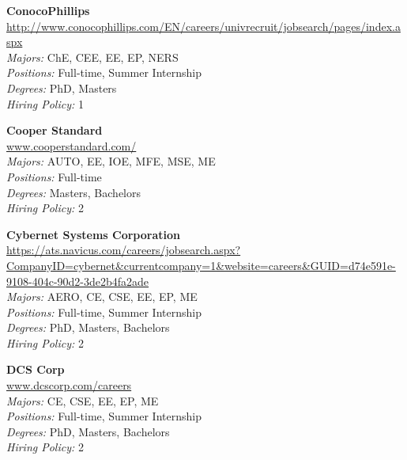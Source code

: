 \documentclass[twoside]{article}
\begin{document}
\begin{center}
\begin{multicols}{3}
\begin{minipage}{.9\columnwidth}{\Large\bf ConocoPhillips }\\
	\url{http://www.conocophillips.com/EN/careers/univrecruit/jobsearch/pages/index.aspx}\\
	\emph{Majors:} ChE, CEE, EE, EP, NERS\\
	\emph{Positions:} Full-time, Summer Internship\\
	\emph{Degrees:} PhD, Masters\\
	\emph{Hiring Policy:} 1\\
\end{minipage}
 
\begin{minipage}{.9\columnwidth}{\Large\bf Cooper Standard }\\
	\url{www.cooperstandard.com/}\\
	\emph{Majors:} AUTO, EE, IOE, MFE, MSE, ME\\
	\emph{Positions:} Full-time\\
	\emph{Degrees:} Masters, Bachelors\\
	\emph{Hiring Policy:} 2\\
\end{minipage}
 
\begin{minipage}{.9\columnwidth}{\Large\bf Cybernet Systems Corporation }\\
	\url{https://ats.navicus.com/careers/jobsearch.aspx?CompanyID=cybernet&currentcompany=1&website=careers&GUID=d74e591e-9108-404c-90d2-3de2b4fa2ade}\\
	\emph{Majors:} AERO, CE, CSE, EE, EP, ME\\
	\emph{Positions:} Full-time, Summer Internship\\
	\emph{Degrees:} PhD, Masters, Bachelors\\
	\emph{Hiring Policy:} 2\\
\end{minipage}
 
\begin{minipage}{.9\columnwidth}{\Large\bf DCS Corp }\\
	\url{www.dcscorp.com/careers}\\
	\emph{Majors:} CE, CSE, EE, EP, ME\\
	\emph{Positions:} Full-time, Summer Internship\\
	\emph{Degrees:} PhD, Masters, Bachelors\\
	\emph{Hiring Policy:} 2\\
\end{minipage}
 

\end{multicols}
\end{center}
\end{document}

